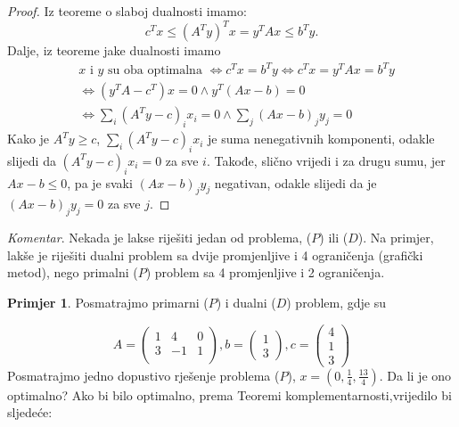 \documentclass[a4paper, utf8, 11pt, colorlinks]{book}
\theoremstyle{definition}
\newtheorem{primjer}{Primjer}[chapter]
\begin{document}
\begin{proof}
         Iz teoreme o slaboj dualnosti imamo: 
         \begin{equation}
             c^Tx \leq ( A^T y)^T x = y^T A x \leq b^T y. 
         \end{equation}
         Dalje, iz teoreme jake dualnosti imamo  
         \begin{align*}
             &x \mbox{ i } y \mbox{ su oba optimalna } \Longleftrightarrow c^T x = b^T y \Longleftrightarrow c^Tx = y^TA x = b^Ty \\
             &\Longleftrightarrow (y^T A - c^T) x = 0 \wedge y^T(Ax - b )  = 0\\
             & \Longleftrightarrow \sum_i (A^T y - c)_i x_i = 0 \wedge \sum_j (Ax - b)_j y_j = 0
         \end{align*}
         Kako je $A^Ty \geq c$, $\sum_i (A^T y - c)_i x_i$ je suma nenegativnih komponenti, odakle slijedi da   $(A^T y - c)_i x_i= 0$ za sve $i$. Takođe, slično vrijedi i za drugu sumu, jer $Ax - b \leq 0$, pa je svaki  $(Ax - b)_j y_j$ negativan, odakle slijedi da je $(Ax - b)_j y_j = 0$ za sve $j$.
\end{proof}

\emph{Komentar}.  Nekada je lakse riješiti jedan od problema, ($P$)  ili  ($D$).  Na primjer, lakše je riješiti dualni problem sa dvije promjenljive i 4 ograničenja (grafički metod), nego primalni  ($P$)  problem sa 4 promjenljive i 2 ograničenja. 

\begin{primjer} Posmatrajmo primarni  ($P$)  i dualni ($D$) problem, gdje su
	\end{primjer}
 
$$      A = \left(\begin{array}{ccc}
          1 &  4 & 0 \\
          3 & -1 & 1 \\
      \end{array} \right ), b = \left (\begin{array}{c}
           1 \\
           3
      \end{array}\right ), c =\left ( \begin{array}{c}
           4  \\
           1  \\
           3
      \end{array} \right )
 $$
Posmatrajmo jedno dopustivo rješenje problema  ($P$), $x = (0, \frac{1}{4}, \frac{13}{4})$. Da li je ono optimalno? Ako bi bilo optimalno,  prema Teoremi komplementarnosti,vrijedilo bi sljedeće:
\end{document}
